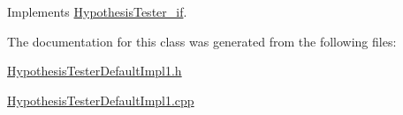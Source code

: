 Implements \hyperlink{class_hypothesis_tester__if_a28e2e287d35f6843a14bd2765b76b6bb}{Hypothesis\+Tester\+\_\+if}.



The documentation for this class was generated from the following files\+:\begin{DoxyCompactItemize}
\item 
\hyperlink{_hypothesis_tester_default_impl1_8h}{Hypothesis\+Tester\+Default\+Impl1.\+h}\item 
\hyperlink{_hypothesis_tester_default_impl1_8cpp}{Hypothesis\+Tester\+Default\+Impl1.\+cpp}\end{DoxyCompactItemize}
